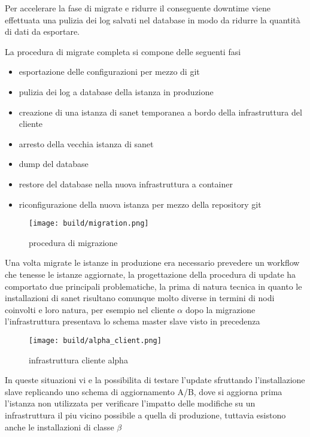 Per accelerare la fase di migrate e ridurre il conseguente downtime viene effettuata una pulizia  dei log salvati nel database in modo da ridurre la quantità di dati da esportare.

La procedura di migrate completa si compone delle seguenti fasi

\begin{itemize}
  \item{esportazione delle configurazioni per mezzo di git}
  \item{pulizia dei log a database della istanza in produzione}
  \item{creazione di una istanza di sanet temporanea a bordo della infrastruttura del cliente}
  \item{arresto della vecchia istanza di sanet}
  \item{dump del database}
  \item{restore del database nella nuova infrastruttura a container}
  \item{riconfigurazione della nuova istanza per mezzo della repository git}
\end{itemize}

\begin{figure}[H]
    \centering
    \texttt{[image: build/migration.png]}
    \caption{procedura di migrazione}
    \label{fig:enter-label}
\end{figure}

Una volta migrate le istanze in produzione era necessario prevedere un workflow che tenesse le istanze aggiornate, la progettazione della procedura di update ha comportato due principali problematiche, la prima di natura tecnica in quanto le installazioni di sanet risultano comunque molto diverse in termini di nodi coinvolti e loro natura, per esempio nel cliente \(\alpha\) dopo la migrazione l'infrastruttura presentava lo schema master slave visto in precedenza

\begin{figure}[H]
    \centering
    \texttt{[image: build/alpha\_client.png]}
    \caption{infrastruttura cliente alpha}
    \label{fig:enter-label}
\end{figure}

In queste situazioni vi e la possibilita di testare l'update sfruttando l'installazione slave replicando uno schema di aggiornamento A/B, dove si aggiorna prima l'istanza non utilizzata per verificare l'impatto delle modifiche su un infrastruttura il piu vicino possibile a quella di produzione, tuttavia esistono anche le installazioni di classe \(\beta\)

